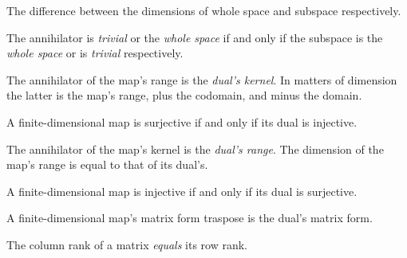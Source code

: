 \begin{multicols}{3}
  The difference between the dimensions of whole space and subspace respectively.

  The annihilator is \textit{trivial} or the \textit{whole space} if and only if
  the subspace is the \textit{whole space} or is \textit{trivial} respectively.

  The annihilator of the map's range is the \textit{dual's kernel}.
  In matters of dimension the latter is the map's range, plus
  the codomain, and minus the domain.
  
  A finite-dimensional map is surjective if and only if its dual is injective.

  The annihilator of the map's kernel is the \textit{dual's range}.
  The dimension of the map's range is equal to that of its dual's.

  A finite-dimensional map is injective if and only if its dual is surjective.

  A finite-dimensional map's matrix form traspose is the dual's matrix form.
  
  The column rank of a matrix \textit{equals} its row rank.

  
  
\end{multicols}


